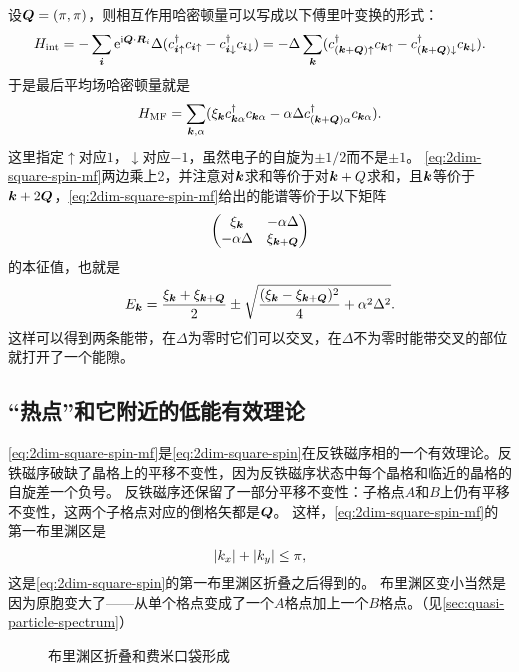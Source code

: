 设$\vb*{Q}=(\pi, \pi)$，则相互作用哈密顿量可以写成以下傅里叶变换的形式： 
\begin{equation}
    {H}_\text{int} = - \sum_{\vb*{i}} \mathrm{e}^{\mathrm{i} \vb*{Q} \cdot \vb*{R}_i} \Delta ({c}_{\vb*{i} \uparrow}^\dagger {c}_{\vb*{i} \uparrow} - {c}_{\vb*{i} \downarrow}^\dagger {c}_{\vb*{i} \downarrow}) 
    = - \Delta \sum_{\vb*{k}} ({c}_{(\vb*{k} + \vb*{Q})\uparrow}^\dagger {c}_{\vb*{k} \uparrow} - {c}_{(\vb*{k}+\vb*{Q}) \downarrow}^\dagger {c}_{\vb*{k} \downarrow}).
\end{equation}
于是最后平均场哈密顿量就是
\begin{equation}
    {H}_\text{MF} = \sum_{\vb*{k}, \alpha} (\xi_{\vb*{k}} {c}_{\vb*{k} \alpha}^\dagger {c}_{\vb*{k} \alpha} - \alpha \Delta {c}_{(\vb*{k} + \vb*{Q}) \alpha}^\dagger {c}_{\vb*{k} \alpha}).
    \label{eq:2dim-square-spin-mf}
\end{equation}
这里指定$\uparrow$对应$1$，$\downarrow$对应$-1$，虽然电子的自旋为$\pm 1/2$而不是$\pm 1$。
\eqref{eq:2dim-square-spin-mf}两边乘上2，并注意对$\vb*{k}$求和等价于对$\vb*{k}+Q$求和，且$\vb*{k}$等价于$\vb*{k}+2\vb*{Q}$，\eqref{eq:2dim-square-spin-mf}给出的能谱等价于以下矩阵
\[
    \pmqty{\xi_{\vb*{k}} & - \alpha \Delta \\ - \alpha \Delta & \xi_{\vb*{k} + \vb*{Q}}}
\]
的本征值，也就是
\begin{equation}
    E_{\vb*{k}} = \frac{\xi_{\vb*{k}} + \xi_{\vb*{k} + \vb*{Q}}}{2} \pm \sqrt{\frac{(\xi_{\vb*{k}} - \xi_{\vb*{k}+\vb*{Q}})^2}{4} + \alpha^2 \Delta^2}.
\end{equation}
这样可以得到两条能带，在$\Delta$为零时它们可以交叉，在$\Delta$不为零时能带交叉的部位就打开了一个能隙。

\subsection{“热点”和它附近的低能有效理论}

\eqref{eq:2dim-square-spin-mf}是\eqref{eq:2dim-square-spin}在反铁磁序相的一个有效理论。反铁磁序破缺了晶格上的平移不变性，因为反铁磁序状态中每个晶格和临近的晶格的自旋差一个负号。
反铁磁序还保留了一部分平移不变性：子格点$A$和$B$上仍有平移不变性，这两个子格点对应的倒格矢都是$\vb*{Q}$。
这样，\eqref{eq:2dim-square-spin-mf}的第一布里渊区是
\[
    \abs{k_x} + \abs{k_y} \leq \pi,
\]
这是\eqref{eq:2dim-square-spin}的第一布里渊区折叠之后得到的。
布里渊区变小当然是因为原胞变大了——从单个格点变成了一个$A$格点加上一个$B$格点。（见\autoref{sec:quasi-particle-spectrum}）

\begin{figure}
    \centering
    \subfigure[一个单带模型的第一布里渊区和费米面]{
        
    }
    \subfigure[热点]{
        
    }
    \caption{布里渊区折叠和费米口袋形成}
\end{figure}


